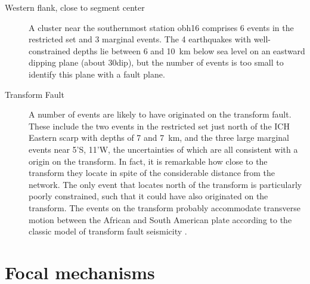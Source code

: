 \documentclass[jgr]{aguplus}
\newlength{\tw}
\begin{document}
\begin{article}
\begin{description}
\item[Western flank, close to segment center]
A cluster near the southernmost station obh16
comprises 6 events in the restricted set and 3 marginal events.
The 4 earthquakes with well-constrained depths lie between  6 and
10~km below sea level on an eastward
dipping plane (about 30\dg dip), but the number of events is too small to identify this
plane with a fault plane.

\item[Transform Fault]  A number of events are likely to have
originated on the transform fault.  These include the two events in the
restricted set just north of the ICH Eastern scarp with depths of
7 and 7~km, and the three
large marginal events near 5'S, 11'W, the uncertainties of
which are all consistent with a origin on the transform. In fact, it
is remarkable how close to the transform they locate in spite of  the
considerable distance from the network.  The only event that locates  north of the transform is
particularly poorly constrained, such that it could have also
originated on the transform.  The events on the transform probably
accommodate transverse motion between the African and South American
plate according to the classic model of transform fault seismicity \citep{sykes67}.
\end{description}

\section{Focal mechanisms}


\end{article}
\end{document}
